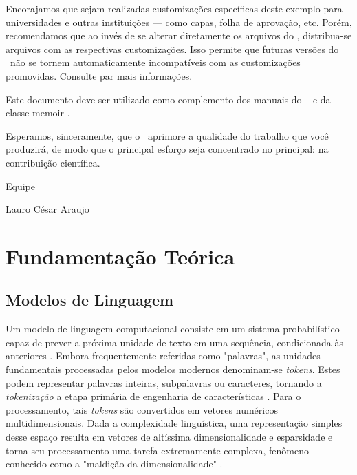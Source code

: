 \documentclass[
	12pt,				%
	openright,			%
	oneside,			%
	a4paper,			%
	dissertacao,			%
	]{ABNT-DC-UEL}
\begin{document}
Encorajamos que sejam realizadas customizações específicas deste exemplo para universidades e outras instituições --- como capas, folha de aprovação, etc. Porém, recomendamos que ao invés de se alterar diretamente os arquivos do \abnTeX, distribua-se arquivos com as respectivas customizações. Isso permite que futuras versões do \abnTeX~não se tornem automaticamente incompatíveis com as customizações promovidas. Consulte  par mais informações.

Este documento deve ser utilizado como complemento dos manuais do \abnTeX\
\cite{abntex2classe,abntex2cite,abntex2cite-alf} e da classe \textsf{memoir}
\cite{memoir}.

Esperamos, sinceramente, que o \abnTeX\ aprimore a qualidade do trabalho que você produzirá, de modo que o principal esforço seja concentrado no principal: na contribuição científica.

Equipe \abnTeX

Lauro César Araujo




\chapter{Fundamentação Teórica}

\section{Modelos de Linguagem}

Um modelo de linguagem computacional consiste em um sistema probabilístico capaz de prever a próxima unidade de texto em uma sequência, condicionada às anteriores \cite{caseli2024}. Embora frequentemente referidas como "palavras", as unidades fundamentais processadas pelos modelos modernos denominam-se \textit{tokens}. Estes podem representar palavras inteiras, subpalavras ou caracteres, tornando a \textit{tokenização} a etapa primária de engenharia de características \cite{raff2025,caseli2024}. Para o processamento, tais \textit{tokens} são convertidos em vetores numéricos multidimensionais. Dada a complexidade linguística, uma representação simples desse espaço resulta em vetores de altíssima dimensionalidade e esparsidade e torna seu processamento uma tarefa extremamente complexa, fenômeno conhecido como a "maldição da dimensionalidade" \cite{raff2025}.
\end{document}
